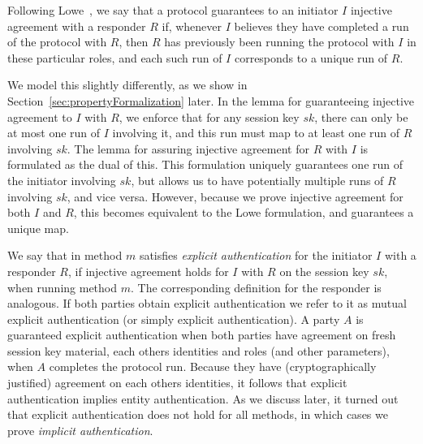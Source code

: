  
\label{sec:authenticationDef}
Following Lowe~\cite{DBLP:conf/csfw/Lowe97a}, we say that a protocol guarantees to an
initiator $I$ injective agreement with a responder $R$ if, whenever $I$ believes
they have completed a run of the protocol with $R$, then $R$ has previously been
running the protocol with $I$ in these particular roles, and each such run of
$I$ corresponds to a unique run of $R$.

We model this slightly differently, as we show in Section~\ref{sec:propertyFormalization} later. In the lemma for guaranteeing injective agreement to $I$ with $R$, we enforce that for any session key $sk$, there can only be at most one run of $I$ involving it, and this run must map to at least one run of $R$ involving $sk$. The lemma for assuring injective agreement for $R$ with $I$ is formulated as the dual of this. This formulation uniquely guarantees one run of the initiator involving $sk$, but allows us to have potentially multiple runs of $R$ involving $sk$, and vice versa. However, because we prove injective agreement for both $I$ and $R$, this becomes equivalent to the Lowe formulation, and guarantees a unique map.

%
We say that \mEdhoc{} in method $m$ satisfies \emph{explicit authentication} for
the initiator $I$ with a responder $R$, if injective agreement holds for $I$
with $R$ on the session key $sk$, when running method $m$.
%
The corresponding definition for the responder is analogous.
%
If both parties obtain explicit authentication we refer to it as mutual explicit
authentication (or simply explicit authentication).
%
A party $A$ is guaranteed explicit authentication when both parties have
agreement on fresh session key material, each others identities and roles
(and other parameters), when $A$ completes the protocol run.
%
Because they have (cryptographically justified) agreement on each others
identities, it follows that explicit authentication implies entity
authentication.
%
As we discuss later, it turned out that explicit authentication does not hold for all
\mEdhoc{} methods, in which cases we prove \emph{implicit authentication}.

